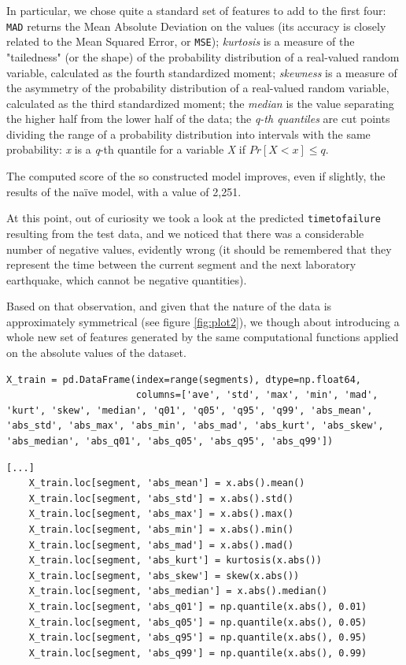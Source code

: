 In particular, we chose quite a standard set of features to add to the first four: \texttt{MAD} returns the Mean Absolute Deviation on the values (its accuracy is closely related to the Mean Squared Error, or \texttt{MSE}); \textit{kurtosis} is a measure of the "tailedness" (or the shape) of the probability distribution of a real-valued random variable, calculated as the fourth standardized moment; \textit{skewness} is a measure of the asymmetry of the probability distribution of a real-valued random variable, calculated as the third standardized moment; the \textit{median} is the value separating the higher half from the lower half of the data; the \textit{q-th quantiles} are cut points dividing the range of a probability distribution into intervals with the same probability: \textit{x} is a \textit{q}-th quantile for a variable \textit{X} if \(Pr[X<x]\leq q\).

The computed score of the so constructed model improves, even if slightly, the results of the na{\"i}ve model, with a value of 2,251.

\bigbreak

At this point, out of curiosity we took a look at the predicted \texttt{time\textunderscore to\textunderscore failure} resulting from the test data, and we noticed that there was a considerable number of negative values, evidently wrong (it should be remembered that they represent the time between the current segment and the next laboratory earthquake, which cannot be negative quantities).

Based on that observation, and given that the nature of the data is approximately symmetrical (see figure \ref{fig:plot2}), we though about introducing a whole new set of features generated by the same computational functions applied on the absolute values of the dataset.

\begin{lstlisting}[firstnumber=39]
X_train = pd.DataFrame(index=range(segments), dtype=np.float64,
                       columns=['ave', 'std', 'max', 'min', 'mad', 'kurt', 'skew', 'median', 'q01', 'q05', 'q95', 'q99', 'abs_mean', 'abs_std', 'abs_max', 'abs_min', 'abs_mad', 'abs_kurt', 'abs_skew', 'abs_median', 'abs_q01', 'abs_q05', 'abs_q95', 'abs_q99'])
\end{lstlisting}

\begin{lstlisting}[firstnumber=66]
	[...]
    X_train.loc[segment, 'abs_mean'] = x.abs().mean()
    X_train.loc[segment, 'abs_std'] = x.abs().std()
    X_train.loc[segment, 'abs_max'] = x.abs().max()
    X_train.loc[segment, 'abs_min'] = x.abs().min()
    X_train.loc[segment, 'abs_mad'] = x.abs().mad()
    X_train.loc[segment, 'abs_kurt'] = kurtosis(x.abs())
    X_train.loc[segment, 'abs_skew'] = skew(x.abs())
    X_train.loc[segment, 'abs_median'] = x.abs().median()
    X_train.loc[segment, 'abs_q01'] = np.quantile(x.abs(), 0.01)
    X_train.loc[segment, 'abs_q05'] = np.quantile(x.abs(), 0.05)
    X_train.loc[segment, 'abs_q95'] = np.quantile(x.abs(), 0.95)
    X_train.loc[segment, 'abs_q99'] = np.quantile(x.abs(), 0.99)
\end{lstlisting}


